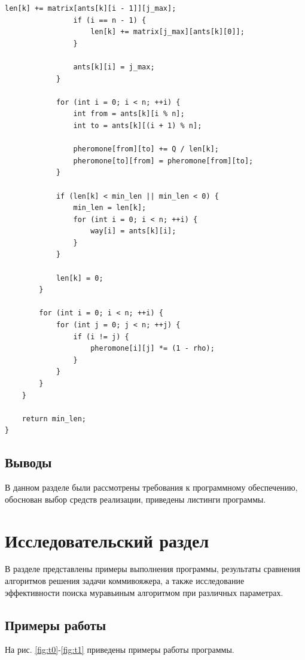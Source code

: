\documentclass[a4paper,12pt]{article}
\begin{document}
\begin{lstlisting}[label=lst2,caption=Реализация
муравьиного алгоритма для решения задачи коммивояжера]
                len[k] += matrix[ants[k][i - 1]][j_max];
                if (i == n - 1) {
                    len[k] += matrix[j_max][ants[k][0]];
                }

                ants[k][i] = j_max;
            }

            for (int i = 0; i < n; ++i) {
                int from = ants[k][i % n];
                int to = ants[k][(i + 1) % n];

                pheromone[from][to] += Q / len[k];
                pheromone[to][from] = pheromone[from][to];
            }

            if (len[k] < min_len || min_len < 0) {
                min_len = len[k];
                for (int i = 0; i < n; ++i) {
                    way[i] = ants[k][i];
                }
            }

            len[k] = 0;
        }

        for (int i = 0; i < n; ++i) {
            for (int j = 0; j < n; ++j) {
                if (i != j) {
                    pheromone[i][j] *= (1 - rho);
                }
            }
        }
    }

    return min_len;
}
\end{lstlisting}


\subsection*{Выводы}

В данном разделе были рассмотрены требования к 
программному обеспечению, обоснован выбор средств 
реализации, приведены листинги программы.

\newpage
\section{Исследовательский раздел}

В разделе представлены примеры выполнения программы,
результаты сравнения
алгоритмов решения задачи коммивояжера,
а также исследование \\ эффективности
поиска муравьиным алгоритмом при различных параметрах.

\subsection{Примеры работы}
        
На рис. \ref{fig:t0}-\ref{fig:t1} приведены примеры работы программы. 
        
\end{document}
